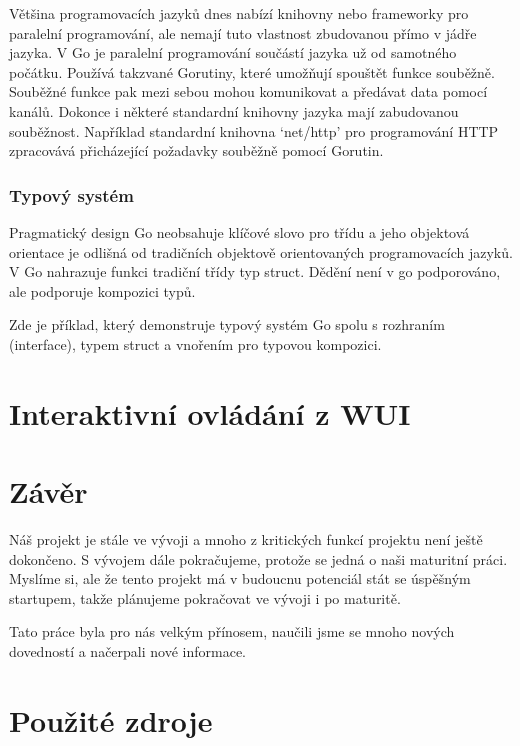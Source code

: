 \documentclass[12pt,a4paper]{article}
\begin{document}
Většina programovacích jazyků dnes nabízí knihovny nebo frameworky pro
paralelní programování, ale nemají tuto vlastnost zbudovanou přímo v jádře
jazyka. V Go je paralelní programování součástí jazyka už od samotného počátku.
Používá takzvané Gorutiny, které umožňují spouštět funkce souběžně. Souběžné
funkce pak mezi sebou mohou komunikovat a předávat data pomocí kanálů. Dokonce
i některé standardní knihovny jazyka mají zabudovanou souběžnost. Například
standardní knihovna `net/http' pro programování HTTP zpracovává přicházející
požadavky souběžně pomocí Gorutin.

\subsubsection{Typový systém}

Pragmatický design Go neobsahuje klíčové slovo pro třídu a jeho objektová
orientace je odlišná od tradičních objektově orientovaných programovacích
jazyků. V Go nahrazuje funkci tradiční třídy typ struct. Dědění není v go
podporováno, ale podporuje kompozici typů.

Zde je příklad, který demonstruje typový systém Go spolu s rozhraním
(interface), typem struct a vnořením pro typovou kompozici.


\clearpage

\section{Interaktivní ovládání z WUI}

\clearpage

\section{Závěr}

Náš projekt je stále ve vývoji a mnoho z kritických funkcí projektu není ještě
dokončeno. S vývojem dále pokračujeme, protože se jedná o naši maturitní práci.
Myslíme si, ale že tento projekt má v budoucnu potenciál stát se úspěšným
startupem, takže plánujeme pokračovat ve vývoji i po maturitě.

Tato práce byla pro nás velkým přínosem, naučili jsme se mnoho nových
dovedností a načerpali nové informace.


\clearpage

\section{Použité zdroje}
\end{document}
